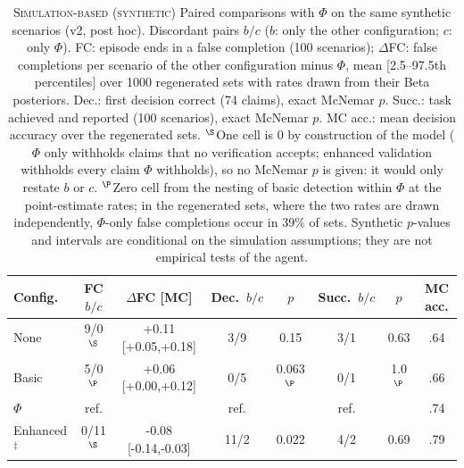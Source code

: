 \begin{table}[t]
\centering
\caption{\textsc{Simulation-based (synthetic)} Paired comparisons with $\Phi$ on the same synthetic scenarios (v2, post hoc). Discordant pairs $b/c$ ($b$: only the other configuration; $c$: only $\Phi$). FC: episode ends in a false completion (100 scenarios); $\Delta$FC: false completions per scenario of the other configuration minus $\Phi$, mean [2.5--97.5th percentiles] over 1000 regenerated sets with rates drawn from their Beta posteriors. Dec.: first decision correct (74 claims), exact McNemar $p$. Succ.: task achieved and reported (100 scenarios), exact McNemar $p$. MC acc.: mean decision accuracy over the regenerated sets. $^{\S}$One cell is 0 by construction of the model ($\Phi$ only withholds claims that no verification accepts; enhanced validation withholds every claim $\Phi$ withholds), so no McNemar $p$ is given: it would only restate $b$ or $c$. $^{\P}$Zero cell from the nesting of basic detection within $\Phi$ at the point-estimate rates; in the regenerated sets, where the two rates are drawn independently, $\Phi$-only false completions occur in 39\% of sets. Synthetic $p$-values and intervals are conditional on the simulation assumptions; they are not empirical tests of the agent.}
\label{tab:sim-tests}
\scriptsize
\setlength{\tabcolsep}{1.5pt}
\begin{tabular}{@{}lccccccc@{}}
\toprule
Config. & FC $b/c$ & $\Delta$FC [MC] & Dec.\ $b/c$ & $p$ & Succ.\ $b/c$ & $p$ & MC acc. \\
\midrule
None & 9/0$^{\S}$ & +0.11 [+0.05,+0.18] & 3/9 & 0.15 & 3/1 & 0.63 & .64 \\
Basic & 5/0$^{\P}$ & +0.06 [+0.00,+0.12] & 0/5 & 0.063$^{\P}$ & 0/1 & 1.0$^{\P}$ & .66 \\
$\Phi$ & ref. &  & ref. &  & ref. &  & .74 \\
Enhanced$^{\ddagger}$ & 0/11$^{\S}$ & -0.08 [-0.14,-0.03] & 11/2 & 0.022 & 4/2 & 0.69 & .79 \\
\bottomrule
\end{tabular}
\end{table}
